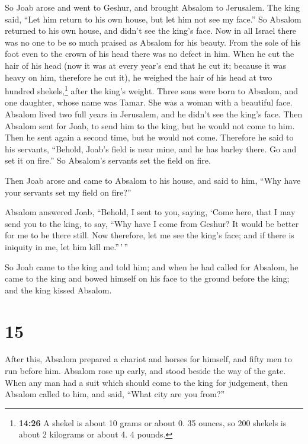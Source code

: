  So Joab arose and went to Geshur, and brought Absalom to
Jerusalem.  The king said, ``Let him return to his own
house, but let him not see my face.'' So Absalom returned to his own
house, and didn't see the king's face.  Now in all Israel
there was no one to be so much praised as Absalom for his beauty. From
the sole of his foot even to the crown of his head there was no defect
in him.  When he cut the hair of his head (now it was at
every year's end that he cut it; because it was heavy on him, therefore
he cut it), he weighed the hair of his head at two hundred
shekels,\footnote{\textbf{14:26} A shekel is about 10 grams or about 0.
  35 ounces, so 200 shekels is about 2 kilograms or about 4. 4 pounds.}
after the king's weight.  Three sons were born to
Absalom, and one daughter, whose name was Tamar. She was a woman with a
beautiful face.  Absalom lived two full years in
Jerusalem, and he didn't see the king's face.  Then
Absalom sent for Joab, to send him to the king, but he would not come to
him. Then he sent again a second time, but he would not come.
 Therefore he said to his servants, ``Behold, Joab's
field is near mine, and he has barley there. Go and set it on fire.'' So
Absalom's servants set the field on fire.

 Then Joab arose and came to Absalom to his house, and
said to him, ``Why have your servants set my field on fire?''

 Absalom answered Joab, ``Behold, I sent to you, saying,
`Come here, that I may send you to the king, to say, ``Why have I come
from Geshur? It would be better for me to be there still. Now therefore,
let me see the king's face; and if there is iniquity in me, let him kill
me.''\,'\,''

 So Joab came to the king and told him; and when he had
called for Absalom, he came to the king and bowed himself on his face to
the ground before the king; and the king kissed Absalom.

\hypertarget{section-14}{%
\section{15}\label{section-14}}

 After this, Absalom prepared a chariot and horses for
himself, and fifty men to run before him.  Absalom rose up
early, and stood beside the way of the gate. When any man had a suit
which should come to the king for judgement, then Absalom called to him,
and said, ``What city are you from?''


